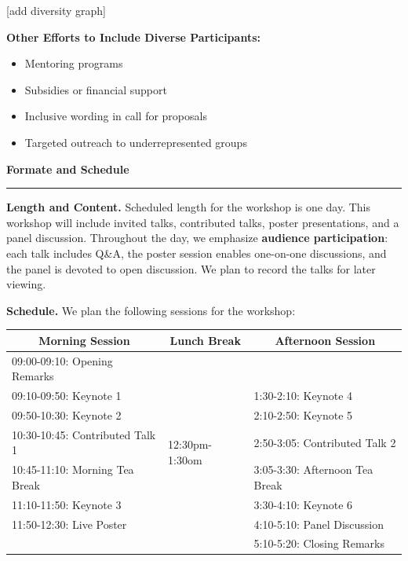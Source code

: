 \documentclass{article}
\newcommand{\sectiontitle}[1]{\noindent\textbf{\textcolor{neuripsblue}{#1}}\vspace{0.1cm}\hrule\vspace{0.2cm}}
\begin{document}
[add diversity graph]

\textbf{Other Efforts to Include Diverse Participants:}
\begin{itemize}
    \item Mentoring programs
    \item Subsidies or financial support
    \item Inclusive wording in call for proposals
    \item Targeted outreach to underrepresented groups
\end{itemize}

\sectiontitle{Formate and Schedule}
\textbf{Length and Content.}
Scheduled length for the workshop is one day. This workshop will include invited talks, contributed talks, poster presentations, and a panel discussion. Throughout the day, we emphasize \textbf{audience participation}: each talk includes Q\&A, the poster session enables one-on-one discussions, and the panel is devoted to open discussion. We plan to record the talks for later viewing. 

\textbf{Schedule.}
We plan the following sessions for the workshop:\\
\begingroup
  \hfill
    \begin{tabular}{l|l|l}
    \toprule
    \multicolumn{1}{c|}{\textbf{Morning Session}}  & \multicolumn{1}{c|}{\textbf{Lunch Break}} & \multicolumn{1}{c}{\textbf{Afternoon Session}}  \\
    \midrule
    09:00-09:10: Opening Remarks &   \multirow{8}{*}{12:30pm-1:30om} &  \\
    09:10-09:50: Keynote 1 & & 1:30-2:10: Keynote 4  \\
    09:50-10:30: Keynote 2 & & 2:10-2:50: Keynote 5  \\
    10:30-10:45: Contributed Talk 1 & & 2:50-3:05: Contributed Talk 2  \\
    10:45-11:10: Morning Tea Break & & 3:05-3:30: Afternoon Tea Break   \\
    11:10-11:50: Keynote 3 & & 3:30-4:10: Keynote 6  \\
    11:50-12:30: Live Poster & & 4:10-5:10: Panel Discussion  \\
     & & 5:10-5:20: Closing Remarks   \\
    \bottomrule
    \end{tabular}%
\hfill
\endgroup
\end{document}
